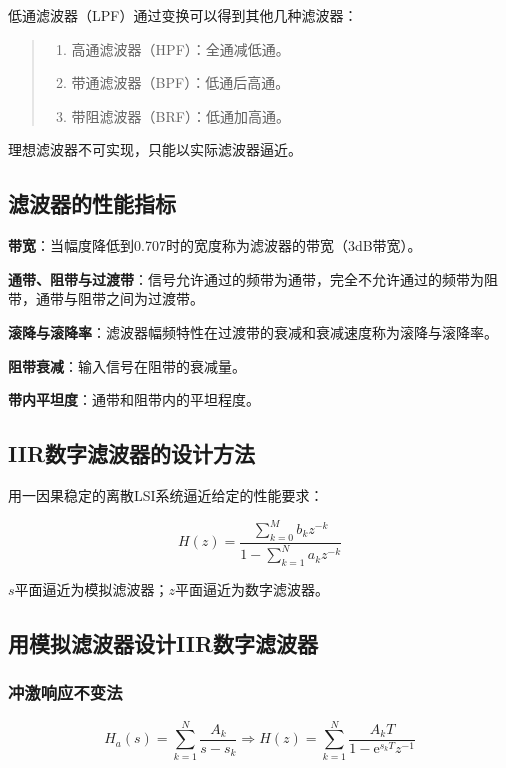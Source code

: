 \documentclass[cn, hazy, blue, normal, 14pt]{elegantnote}
\begin{document}
低通滤波器（LPF）通过变换可以得到其他几种滤波器：

\begin{quote}
\begin{enumerate}
    \item 高通滤波器（HPF）：全通减低通。
    \item 带通滤波器（BPF）：低通后高通。
    \item 带阻滤波器（BRF）：低通加高通。
\end{enumerate}
\end{quote}

理想滤波器不可实现，只能以实际滤波器逼近。

\subsection{滤波器的性能指标}

\textbf{带宽}：当幅度降低到0.707时的宽度称为滤波器的带宽（3dB带宽）。

\textbf{通带、阻带与过渡带}：信号允许通过的频带为通带，完全不允许通过的频带为阻带，通带与阻带之间为过渡带。

\textbf{滚降与滚降率}：滤波器幅频特性在过渡带的衰减和衰减速度称为滚降与滚降率。

\textbf{阻带衰减}：输入信号在阻带的衰减量。

\textbf{带内平坦度}：通带和阻带内的平坦程度。

\subsection{IIR数字滤波器的设计方法}

用一因果稳定的离散LSI系统逼近给定的性能要求：

$$H(z)=\frac{\sum\limits_{k=0}^{M}b_k z^{-k}}{1-\sum\limits_{k=1}^{N}a_k z^{-k}}$$

$s$平面逼近为模拟滤波器；$z$平面逼近为数字滤波器。

\subsection{用模拟滤波器设计IIR数字滤波器}

\subsubsection{冲激响应不变法}

\begin{equation}
    H_a(s)=\sum_{k=1}^{N}\frac{A_k}{s-s_k} \Rightarrow H(z)=\sum_{k=1}^{N}\frac{A_k T}{1-\text{e}^{s_k T}z^{-1}} 
\end{equation}
\end{document}
